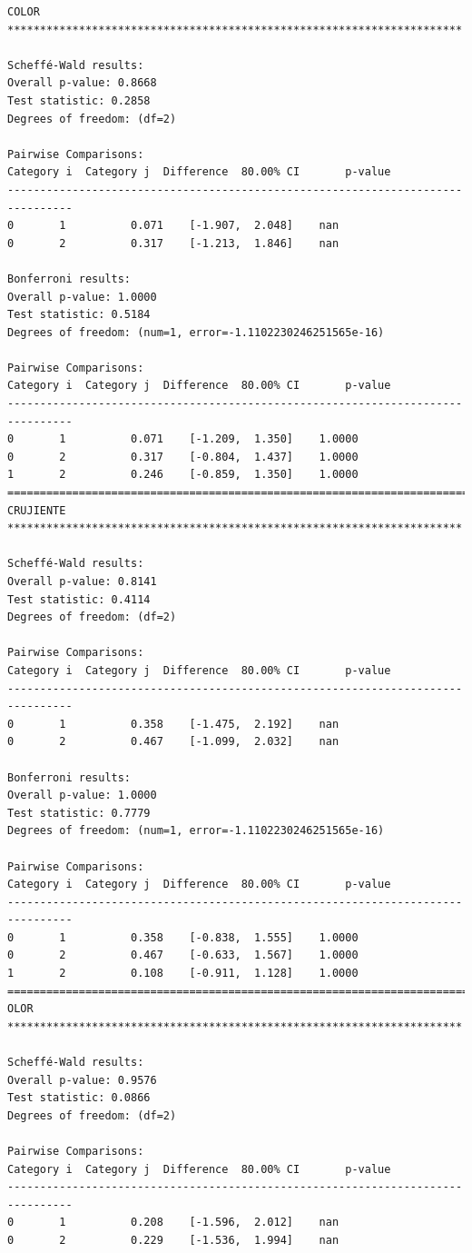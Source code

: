 \begin{lstlisting}
COLOR **********************************************************************

Scheffé-Wald results:
Overall p-value: 0.8668
Test statistic: 0.2858
Degrees of freedom: (df=2)

Pairwise Comparisons:
Category i  Category j  Difference  80.00% CI       p-value
--------------------------------------------------------------------------------
0       1          0.071    [-1.907,  2.048]    nan
0       2          0.317    [-1.213,  1.846]    nan

Bonferroni results:
Overall p-value: 1.0000
Test statistic: 0.5184
Degrees of freedom: (num=1, error=-1.1102230246251565e-16)

Pairwise Comparisons:
Category i  Category j  Difference  80.00% CI       p-value
--------------------------------------------------------------------------------
0       1          0.071    [-1.209,  1.350]    1.0000
0       2          0.317    [-0.804,  1.437]    1.0000
1       2          0.246    [-0.859,  1.350]    1.0000
================================================================================
CRUJIENTE **********************************************************************

Scheffé-Wald results:
Overall p-value: 0.8141
Test statistic: 0.4114
Degrees of freedom: (df=2)

Pairwise Comparisons:
Category i  Category j  Difference  80.00% CI       p-value
--------------------------------------------------------------------------------
0       1          0.358    [-1.475,  2.192]    nan
0       2          0.467    [-1.099,  2.032]    nan

Bonferroni results:
Overall p-value: 1.0000
Test statistic: 0.7779
Degrees of freedom: (num=1, error=-1.1102230246251565e-16)

Pairwise Comparisons:
Category i  Category j  Difference  80.00% CI       p-value
--------------------------------------------------------------------------------
0       1          0.358    [-0.838,  1.555]    1.0000
0       2          0.467    [-0.633,  1.567]    1.0000
1       2          0.108    [-0.911,  1.128]    1.0000
================================================================================
OLOR **********************************************************************

Scheffé-Wald results:
Overall p-value: 0.9576
Test statistic: 0.0866
Degrees of freedom: (df=2)

Pairwise Comparisons:
Category i  Category j  Difference  80.00% CI       p-value
--------------------------------------------------------------------------------
0       1          0.208    [-1.596,  2.012]    nan
0       2          0.229    [-1.536,  1.994]    nan


\end{lstlisting}
